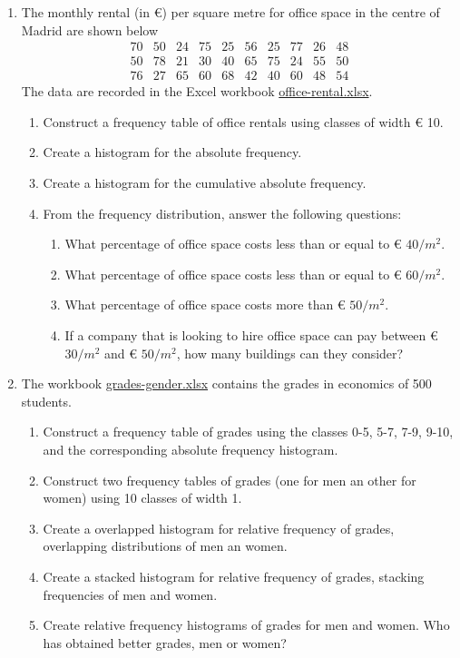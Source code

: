 \begin{enumerate}[leftmargin=*,resume]
\item\label{office-rental} The monthly rental (in €) per square metre for office space in the centre of Madrid are shown below
\[
\begin{array}{cccccccccc}
70 & 50 & 24 & 75 & 25 & 56 & 25 & 77 & 26 & 48 \\
50 & 78 & 21 & 30 & 40 & 65 & 75 & 24 & 55 & 50 \\
76 & 27 & 65 & 60 & 68 & 42 & 40 & 60 & 48 & 54
\end{array}
\]
The data are recorded in the Excel workbook \href{http://aprendeconalf.es/office/excel/exercises/descriptive-statistics/office-rental.xlsx}{\textsf{office-rental.xlsx}}.

\begin{enumerate}
\item Construct a frequency table of office rentals using classes of width € 10. 
\item Create a histogram for the absolute frequency.
\item Create a histogram for the cumulative absolute frequency. 
\item From the frequency distribution, answer the following questions:
\begin{enumerate}
\item What percentage of office space costs less than or equal to € $40/m^2$.
\item What percentage of office space costs less than or equal to € $60/m^2$.
\item What percentage of office space costs more than € $50/m^2$.
\item If a company that is looking to hire office space can pay between € $30/m^2$ and € $50/m^2$, how many buildings
can they consider?
\end{enumerate}
\end{enumerate}


\item\label{grades-gender} The workbook
\href{http://aprendeconalf.es/office/excel/exercises/descriptive-statistics/grades-gender.xlsx}{\textsf{grades-gender.xlsx}}
contains the grades in economics of 500 students. 
\begin{enumerate}
\item Construct a frequency table of grades using the classes 0-5, 5-7, 7-9, 9-10, and the corresponding absolute
frequency histogram. 
\item Construct two frequency tables of grades (one for men an other for women) using 10 classes of width 1. 
\item Create a overlapped histogram for relative frequency of grades, overlapping distributions of men an women.  
\item Create a stacked histogram for relative frequency of grades, stacking frequencies of men and women. 
\item Create relative frequency histograms of grades for men and women. 
Who has obtained better grades, men or women?  
\end{enumerate}



\end{enumerate}
